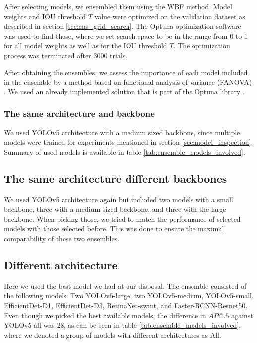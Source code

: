 After selecting models, we ensembled them using the WBF method. Model weights and IOU threshold $T$ value were optimized on the validation dataset as described in section \ref{sec:ens_grid_search}. The Optuna optimization software was used to find those, where we set search-space to be in the range from 0 to 1 for all model weights as well as for the IOU threshold $T$. The optimization process was terminated after $3000$ trials.

After obtaining the ensembles, we assess the importance of each model included in the ensemble by a method based on functional analysis of variance (FANOVA) \cite{Hutter2014}. We used an already implemented solution that is part of the Optuna library \cite{Akiba2019}.
\subsubsection{The same architecture and backbone}
We used YOLOv5 architecture with a medium sized backbone, since multiple models were trained for experiments mentioned in section \ref{sec:model_inspection}. Summary of used models is available in table \ref{tab:ensemble_models_involved}.

\subsection{The same architecture different backbones}
We used YOLOv5 architecture again but included two models with a small backbone, three with a medium-sized backbone, and three with the large backbone. When picking those, we tried to match the performance of selected models with those selected before. This was done to ensure the maximal comparability of those two ensembles.

\subsection{Different architecture}
Here we used the best model we had at our disposal. The ensemble consisted of the following models: Two YOLOv5-large, two YOLOv5-medium, YOLOv5-small, EfficientDet-D1, EfficientDet-D3, RetinaNet-swint, and Faster-RCNN-Resnet50. Even though we picked the best available models, the difference in $AP@.5$ against YOLOv5-all was $2\$$, as can be seen in table \ref{tab:ensemble_models_involved}, where we denoted a group of models with different architectures as All.

